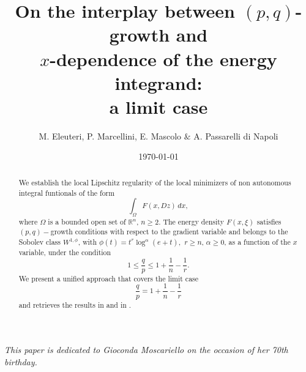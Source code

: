 \documentclass[12pt]{amsart}
\date{\today}
\theoremstyle{definition}
\numberwithin{equation}{section}
\numberwithin{equation}{section}
\begin{document}
\title[On the interplay between $(p,q)$-growth and the $x$-dependence]{On the interplay between $(p,q)$-growth and \\ $x$-dependence of the energy integrand:\\ a limit case}
\author{M. Eleuteri, P. Marcellini, E. Mascolo $\&$ A. Passarelli di Napoli}

\address{Michela Eleuteri , Dipartimento di Scienze Fisiche, Informatiche e Matematiche  \\ Universit\`{a} di Modena e Reggio Emilia, via Campi 213/b - 41121 Modena, Italy}

\address{Paolo Marcellini, Dipartimento di Matematica e Informatica \lq\lq U. Dini"\\
Universit\`a di Firenze,
Viale Morgagni 67/a,
50134 Firenze,
Italy} 

\address{Elvira Mascolo, Dipartimento di Matematica e Informatica \lq\lq U. Dini"\\
Universit\`a di Firenze,
Viale Morgagni 67/a,
50134 Firenze,
Italy} 


\address{Antonia Passarelli di Napoli, Dipartimento di Matematica e Applicazioni "R.
Caccioppoli" \\ Universit\`{a} di Napoli ``Federico
II", via Cintia - 80126 Napoli, Italy}


\maketitle
\begin{center}
{\footnotesize{\textit{This paper is dedicated to Gioconda Moscariello  on the
			occasion of her 70th birthday.  %
            }}}
\end{center}

\begin{abstract}
{We establish the local Lipschitz regularity of the local minimizers of non autonomous integral funtionals of the form
\[
\int_\Omega F(x, Dz)\,dx,
\]
where $\Omega$ is a bounded open set of $\mathbb{R}^n$, $n \ge 2$. The energy density $F(x,\xi)$  satisfies $(p,q)-$growth conditions with respect to the gradient variable and belongs to the Sobolev class $W^{1,\phi}$, with $\phi(t)=t^r\log^\alpha(e+t),$  $r\ge n$, $\alpha\ge 0$,  as a function of the $x$ variable, under the condition
$$
1\le\frac{q}{p} \le 1 + \frac{1}{n} - \frac{1}{r}.
$$
We present a unified approach that covers the limit case 
$$
\frac{q}{p} = 1 + \frac{1}{n} - \frac{1}{r}
$$
and retrieves the results in \cite{EMM16} and in \cite{CGHPdN20}.}



\end{abstract}
\end{document}
